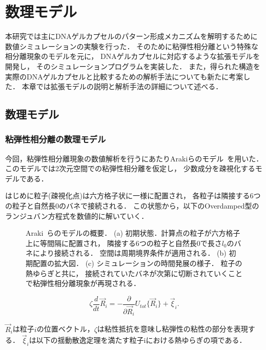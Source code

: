 \chapter{数理モデル}
\label{sec:model}

本研究では主にDNAゲルカプセルのパターン形成メカニズムを解明するために数値シミュレーションの実験を行った．
そのために粘弾性相分離という特殊な相分離現象のモデルを元に，
DNAゲルカプセルに対応するような拡張モデルを開発し，
そのシミュレーションプログラムを実装した．
また，得られた構造を実際のDNAゲルカプセルと比較するための解析手法についても新たに考案した．
本章では拡張モデルの説明と解析手法の詳細について述べる．

\section{数理モデル}

\subsection{粘弾性相分離の数理モデル}
今回，粘弾性相分離現象の数値解析を行うにあたりArakiらのモデル~\cite{araki2005simple}を用いた．
このモデルでは2次元空間での粘弾性相分離を仮定し，
少数成分を疎視化するモデルである．

はじめに粒子(疎視化点)は六方格子状に一様に配置され，
各粒子は隣接する6つの粒子と自然長$0$のバネで接続される．
この状態から，以下のOverdamped型のランジュバン方程式を数値的に解いていく．


\begin{figure}
\centering

\caption{
    Araki~\cite{araki2005simple}らのモデルの概要．
    (a) 初期状態．計算点の粒子が六方格子上に等間隔に配置され，
        隣接する6つの粒子と自然長$0$で長さ$l_0$のバネにより接続される．
        空間は周期境界条件が適用される．
    (b) 初期配置の拡大図．
    (c) シミュレーションの時間発展の様子．
        粒子の熱ゆらぎと共に，
        接続されていたバネが次第に切断されていくことで粘弾性相分離現象が再現される．
}
\label{fig:model_2d}
\end{figure}


\begin{equation}
\label{eq:main}
\zeta
\frac{d}{dt}
\vec{R}_i
=
-\frac{\partial}{\partial\vec{R}_i}
U_{tot}\{\vec{R}_i\}
+\vec{\xi}_i
.
\end{equation}

$\vec{R}_i$は粒子$i$の位置ベクトル，$\zeta$は粘性抵抗を意味し粘弾性の粘性の部分を表現する．
$\vec{\xi}_i$は以下の揺動散逸定理を満たす粒子iにおける熱ゆらぎの項である．

